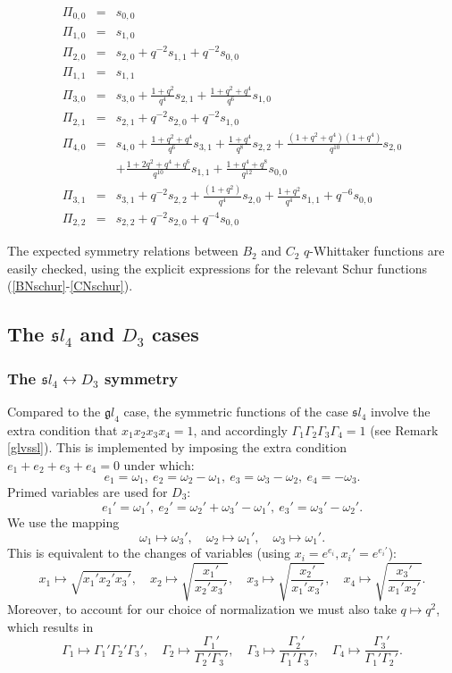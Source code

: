 \documentclass[12pt]{amsart}
\numberwithin{equation}{section}
\numberwithin{table}{section}
\begin{document}
\begin{appendix}
\begin{eqnarray*}
\Pi_{0,0}&=& s_{0,0}\\
\Pi_{1,0}&=& s_{1,0} \\
\Pi_{2,0}&=& s_{2,0}+q^{-2}s_{1,1}+q^{-2}s_{0,0} \\
\Pi_{1,1}&=& s_{1,1} \\
\Pi_{3,0}&=& s_{3,0}+\frac{1+q^2}{q^4} s_{2,1}+\frac{1+q^2+q^4}{q^6}s_{1,0}\\
\Pi_{2,1}&=& s_{2,1}+q^{-2}s_{2,0}+q^{-2} s_{1,0}\\
\Pi_{4,0}&=& s_{4,0}+\frac{1+q^2+q^4}{q^6} s_{3,1}+\frac{1+q^4}{q^8}s_{2,2}+\frac{(1+q^2+q^4)(1+q^4)}{q^{10}}s_{2,0}\\
&&+\frac{1+2q^2+q^4+q^6}{q^{10}}s_{1,1}+\frac{1+q^4+q^8}{q^{12}}s_{0,0}\\
\Pi_{3,1}&=& s_{3,1}+q^{-2}s_{2,2}+\frac{(1+q^2)}{q^{4}}s_{2,0}+\frac{1+q^2}{q^{4}}s_{1,1}+q^{-6}s_{0,0}\\
\Pi_{2,2}&=&s_{2,2}+q^{-2}s_{2,0}+q^{-4}s_{0,0}
\end{eqnarray*}

The expected symmetry relations between $B_2$ and $C_2$ $q$-Whittaker functions are easily checked, using the explicit expressions for the relevant Schur functions (\ref{BNschur}-\ref{CNschur}).

\subsection{The ${\mathfrak sl}_4$ and $D_3$ cases}

\subsubsection{The ${\mathfrak sl}_4\leftrightarrow D_3$ symmetry}
Compared to the ${\mathfrak gl}_4$ case, the symmetric functions of the case ${\mathfrak sl}_4$ involve the extra condition that $x_1x_2x_3x_4=1$, and accordingly $\Gamma_1\Gamma_2\Gamma_3\Gamma_4=1$
(see Remark \ref{glvssl}).
This is implemented by imposing the extra condition $e_1+e_2+e_3+e_4=0$ under which:
$$ e_1=\omega_1,\ e_2=\omega_2-\omega_1,\ e_3=\omega_3-\omega_2,\ e_4=-\omega_3 .$$
Primed variables are used for $D_3$:
$$ e_1'=\omega_1',\ e_2'=\omega_2'+\omega_3'-\omega_1',\ e_3'=\omega_3'-\omega_2' .$$
We use the mapping
$$\omega_1\mapsto \omega_3', \quad \omega_2\mapsto \omega_1', \quad\omega_3\mapsto \omega_1' .$$
This is equivalent to the changes of variables (using $x_i=e^{e_i}, x_i'=e^{e_i'}$):
\begin{equation}\label{sl4tod3} x_1\mapsto \sqrt{x_1'x_2'x_3'},\quad x_2\mapsto \sqrt{\frac{x_1'}{x_2'x_3'}},\quad x_3\mapsto\sqrt{\frac{x_2'}{x_1'x_3'}},\quad x_4\mapsto \sqrt{\frac{x_3'}{x_1'x_2'}} .
\end{equation}
Moreover, to account for our choice of normalization we must also take $q\mapsto q^2$, which results
in
\begin{equation}\label{sl4toD3} \Gamma_1 \mapsto \Gamma_1'\Gamma_2'\Gamma_3',\quad \Gamma_2\mapsto  \frac{\Gamma_1'}{\Gamma_2'\Gamma_3'}, \quad \Gamma_3\mapsto  \frac{\Gamma_2'}{\Gamma_1'\Gamma_3'}, \quad \Gamma_4\mapsto  \frac{\Gamma_3'}{\Gamma_1'\Gamma_2'} .
\end{equation}


\end{appendix}
\end{document}
